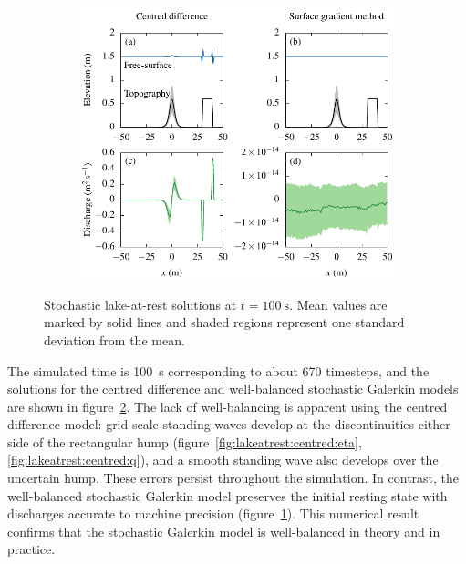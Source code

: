 \begin{figure}
\centering
\begin{subfigure}{\textwidth}
\label{fig:lakeatrest:centred:eta}
\label{fig:lakeatrest:sgm:eta}
\label{fig:lakeatrest:centred:q}
\label{fig:lakeatrest:sgm:q}
\centering
\includegraphics{fig-lakeatrest.pdf}
\end{subfigure}
\caption{Stochastic lake-at-rest solutions at $t = \SI{100}{\second}$.
Mean values are marked by solid lines and shaded regions represent one standard deviation from the mean.}
\label{fig:lakeatrest}
\end{figure}

The simulated time is \SI{100}{\second} corresponding to about 670 timesteps, and the solutions for the centred difference and well-balanced stochastic Galerkin models are shown in figure~\ref{fig:lakeatrest}.
The lack of well-balancing is apparent using the centred difference model: grid-scale standing waves develop at the discontinuities either side of the rectangular hump (figure~\ref{fig:lakeatrest:centred:eta}, \ref{fig:lakeatrest:centred:q}), and a smooth standing wave also develops over the uncertain hump.
These errors persist throughout the simulation.
In contrast, the well-balanced stochastic Galerkin model preserves the initial resting state with discharges accurate to machine precision (figure~\ref{fig:lakeatrest:sgm:q}).
This numerical result confirms that the stochastic Galerkin model is well-balanced in theory and in practice.

